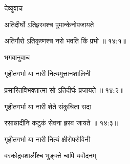 \thispagestyle{empty}


\vers

\centerline{\Large\devanagarifontbold [   चतुर्दशमो ऽध्यायः  ]}{\vrule depth10pt width0pt} 
\fancyhead[LE]{}
\fancyhead[RE]{}
\fancyhead[LO]{}
\fancyhead[RO]{}
\szam\bek



{\devanagarifont देव्युवाच {\dandab}\dontdisplaylinenum  }%
 
{\devanagarifont अतिदीर्घो ऽतिह्रस्वश्च पुमान्केनोपजायते \thinspace{\danda} \dontdisplaylinenum }%


{\devanagarifont अतिगौरो ऽतिकृष्णश्च नरो भवति किं प्रभो {॥ १४:१॥} \veg\dontdisplaylinenum }%
 
{\devanagarifont भगवानुवाच {\dandab}\dontdisplaylinenum  }%
 
{\devanagarifont गृहीतगर्भा या नारी नित्यमुत्तानशालिनी \thinspace{\danda} \dontdisplaylinenum }%


{\devanagarifont प्रसारितविभक्तात्मा सो ऽतिदीर्घः प्रजायते {॥ १४:२॥} \veg\dontdisplaylinenum }%

{\devanagarifont गृहीतगर्भा या नारी शेते संकुचिता सदा \thinspace{\dandab} \dontdisplaylinenum }%
 

{\devanagarifont रसान्नादीनि कटुकं सेवना ह्रस्व जायते {॥ १४:३॥} \veg\dontdisplaylinenum }%

{\devanagarifont गृहीतगर्भा या नारी नित्यं क्षीरोपसेविनी \thinspace{\dandab} \dontdisplaylinenum }%

{\devanagarifont वरकोद्रवशालींश्च भुङ्क्ते चापि यवौदनम्  \danda\dontdisplaylinenum }%

